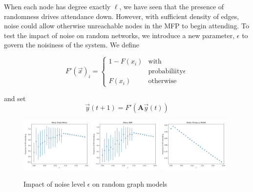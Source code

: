 \documentclass[12pt]{article}
\begin{document}
When each node has degree exactly $\ell$, we have seen that the presence of randomness drives attendance down.  However, with sufficient density of edges, noise could allow otherwise unreachable nodes in the MFP to begin attending.  To test the impact of noise on random networks, we introduce a new parameter, $\epsilon$ to govern the noisiness of the system.  We define

\begin{equation}
  F'(\vec{x})_i = \begin{cases}
    1 - F(x_i) &\text{with} \\
    & \text{probabiliity} \epsilon \\
    F(x_i) &\text{otherwise}
  \end{cases}
\end{equation}

and set
\begin{equation}
  \vec{y}(t + 1) = F'(\mathbf{A}\vec{y}(t))
\end{equation}

\begin{figure}
  \includegraphics[width=0.32\textwidth]{noisy_erdos_renyi.png}
  \includegraphics[width=0.32\textwidth]{noisy_sbm.png}
  \includegraphics[width=0.32\textwidth]{noisy_chung_lu.png}
  \caption{Impact of noise level $\epsilon$ on random graph models}
\end{figure}
\end{document}
